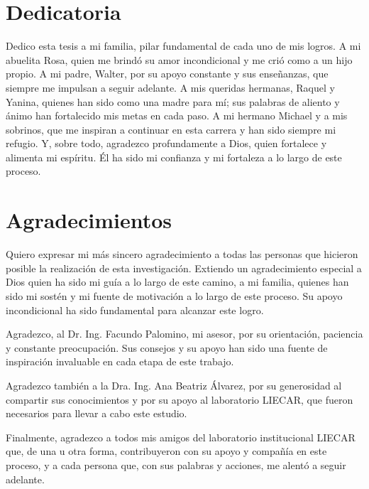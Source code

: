 \chapter*{Dedicatoria}
\doublespacing
Dedico esta tesis a mi familia, pilar fundamental de cada uno de mis logros. A mi abuelita Rosa, quien me brindó su amor incondicional y me crió como a un hijo propio. A mi padre, Walter, por su apoyo constante y sus enseñanzas, que siempre me impulsan a seguir adelante. A mis queridas hermanas, Raquel y Yanina, quienes han sido como una madre para mí; sus palabras de aliento y ánimo han fortalecido mis metas en cada paso. A mi hermano Michael y a mis sobrinos, que me inspiran a continuar en esta carrera y han sido siempre mi refugio. Y, sobre todo, agradezco profundamente a Dios, quien fortalece y alimenta mi espíritu. Él ha sido mi confianza y mi fortaleza a lo largo de este proceso.

\singlespacing

\chapter*{Agradecimientos}
\doublespacing
Quiero expresar mi más sincero agradecimiento a todas las personas que hicieron posible la realización de esta investigación. Extiendo un agradecimiento especial a Dios quien ha sido mi guía a lo largo de este camino, a mi familia, quienes han sido mi sostén y mi fuente de motivación a lo largo de este proceso. Su apoyo incondicional ha sido fundamental para alcanzar este logro.

Agradezco, al Dr. Ing. Facundo Palomino, mi asesor, por su orientación, paciencia y constante preocupación. Sus consejos y su apoyo han sido una fuente de inspiración invaluable en cada etapa de este trabajo.

Agradezco también a la Dra. Ing. Ana Beatriz Álvarez, por su generosidad al compartir sus conocimientos y por su apoyo al laboratorio LIECAR, que fueron necesarios para llevar a cabo este estudio.

Finalmente, agradezco a todos mis amigos del laboratorio institucional LIECAR que, de una u otra forma, contribuyeron con su apoyo y compañía en este proceso, y a cada persona que, con sus palabras y acciones, me alentó a seguir adelante.


\singlespacing

